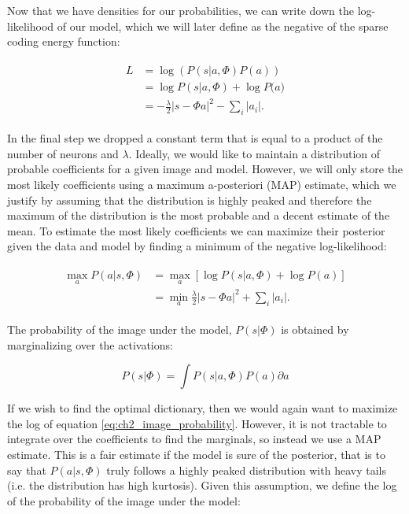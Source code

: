 Now that we have densities for our probabilities, we can write down the log-likelihood of our model, which we will later define as the negative of the sparse coding energy function:

\begin{align}\label{eq:ch2_log_likelihood}
\begin{split}
    L &= \log\left(P(s|a,\Phi)P(a)\right) \\
      &= \log{P(s|a,\Phi)} + \log{P(a}) \\
      &= -\frac{\lambda}{2}|s - \Phi a|^{2} - \sum_{i}|a_{i}|.
\end{split}
\end{align}

In the final step we dropped a constant term that is equal to a product of the number of neurons and $\lambda$. Ideally, we would like to maintain a distribution of probable coefficients for a given image and model. However, we will only store the most likely coefficients using a maximum a-posteriori (MAP) estimate, which we justify by assuming that the distribution is highly peaked and therefore the maximum of the distribution is the most probable and a decent estimate of the mean. To estimate the most likely coefficients we can maximize their posterior given the data and model by finding a minimum of the negative log-likelihood:

\begin{align}\label{eq:ch2_min_log_likelihood}
\begin{split}
    \max_{a} P(a|s,\Phi) &= \max_{a}\left[\log{P(s|a,\Phi)} + \log{P(a)}\right] \\
                         &= \min_{a}\frac{\lambda}{2}|s - \Phi a|^{2} + \sum_{i}|a_{i}|.
\end{split}
\end{align}

The probability of the image under the model, $P(s|\Phi)$ is obtained by marginalizing over the activations:

\begin{equation}\label{eq:ch2_image_probability}
    P(s|\Phi) = \int P(s|a,\Phi) P(a) \partial a 
\end{equation}

If we wish to find the optimal dictionary, then we would again want to maximize the log of equation \eqref{eq:ch2_image_probability}. However, it is not tractable to integrate over the coefficients to find the marginals, so instead we use a MAP estimate. This is a fair estimate if the model is sure of the posterior, that is to say that $P(a|s,\Phi)$ truly follows a highly peaked distribution with heavy tails (i.e. the distribution has high kurtosis). Given this assumption, we define the log of the probability of the image under the model:

